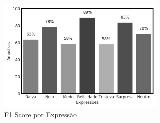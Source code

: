 \begin{figure}[!htb]
    \centering
    \includegraphics[width=8cm]{images/f1_bar.png}
    \caption{F1 Score por Expressão}
    \label{fig:f1_bar}
\end{figure}
